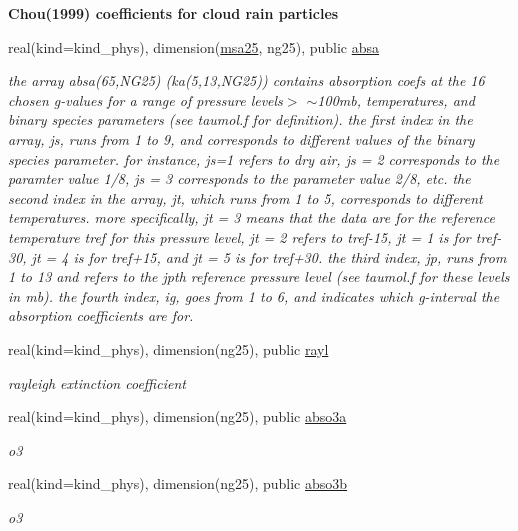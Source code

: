 \begin{Indent}\textbf{ Chou(1999) coefficients for cloud rain particles}\par
\begin{DoxyCompactItemize}
\item 
real(kind=kind\+\_\+phys), dimension(\hyperlink{namespacemodule__radsw__kgb25_afc06df1f3c3a0b2f3189424ed042973e}{msa25}, ng25), public \hyperlink{group__module__radsw__kgbnn_gaf4daf474954d4689219ada6d0662aceb}{absa}
\begin{DoxyCompactList}\small\item\em the array absa(65,\+N\+G25) (ka(5,13,\+N\+G25)) contains absorption coefs at the 16 chosen g-\/values for a range of pressure levels$>$ $\sim$100mb, temperatures, and binary species parameters (see taumol.\+f for definition). the first index in the array, js, runs from 1 to 9, and corresponds to different values of the binary species parameter. for instance, js=1 refers to dry air, js = 2 corresponds to the paramter value 1/8, js = 3 corresponds to the parameter value 2/8, etc. the second index in the array, jt, which runs from 1 to 5, corresponds to different temperatures. more specifically, jt = 3 means that the data are for the reference temperature tref for this pressure level, jt = 2 refers to tref-\/15, jt = 1 is for tref-\/30, jt = 4 is for tref+15, and jt = 5 is for tref+30. the third index, jp, runs from 1 to 13 and refers to the jpth reference pressure level (see taumol.\+f for these levels in mb). the fourth index, ig, goes from 1 to 6, and indicates which g-\/interval the absorption coefficients are for. \end{DoxyCompactList}\item 
real(kind=kind\+\_\+phys), dimension(ng25), public \hyperlink{group__module__radsw__kgbnn_ga3d32a0d74d03129cacd9c4bb2e58683a}{rayl}
\begin{DoxyCompactList}\small\item\em rayleigh extinction coefficient \end{DoxyCompactList}\item 
real(kind=kind\+\_\+phys), dimension(ng25), public \hyperlink{group__module__radsw__kgbnn_gab02765dac8ca71a439cdaf1ed2691851}{abso3a}
\begin{DoxyCompactList}\small\item\em o3 \end{DoxyCompactList}\item 
real(kind=kind\+\_\+phys), dimension(ng25), public \hyperlink{group__module__radsw__kgbnn_ga2844cade392c8805b1d418bc1260b3a5}{abso3b}
\begin{DoxyCompactList}\small\item\em o3 \end{DoxyCompactList}\end{DoxyCompactItemize}
\end{Indent}
